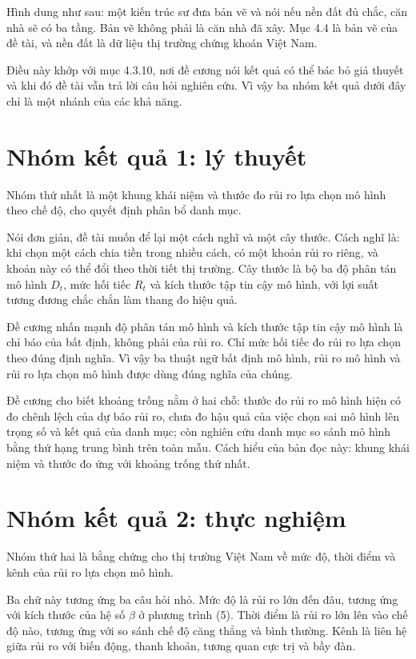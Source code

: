 Hình dung như sau: một kiến trúc sư đưa bản vẽ và nói nếu nền đất đủ chắc, căn nhà sẽ có ba tầng. Bản vẽ không phải là căn nhà đã xây. Mục 4.4 là bản vẽ của đề tài, và nền đất là dữ liệu thị trường chứng khoán Việt Nam.

Điều này khớp với mục 4.3.10, nơi đề cương nói kết quả có thể bác bỏ giả thuyết và khi đó đề tài vẫn trả lời câu hỏi nghiên cứu. Vì vậy ba nhóm kết quả dưới đây chỉ là một nhánh của các khả năng.

\section{Nhóm kết quả 1: lý thuyết}

Nhóm thứ nhất là một khung khái niệm và thước đo rủi ro lựa chọn mô hình theo chế độ, cho quyết định phân bổ danh mục.

Nói đơn giản, đề tài muốn để lại một cách nghĩ và một cây thước. Cách nghĩ là: khi chọn một cách chia tiền trong nhiều cách, có một khoản rủi ro riêng, và khoản này có thể đổi theo thời tiết thị trường. Cây thước là bộ ba độ phân tán mô hình \(D_{t}\), mức hối tiếc \(R_{t}\) và kích thước tập tin cậy mô hình, với lợi suất tương đương chắc chắn làm thang đo hiệu quả.

Đề cương nhấn mạnh độ phân tán mô hình và kích thước tập tin cậy mô hình là chỉ báo của bất định, không phải của rủi ro. Chỉ mức hối tiếc đo rủi ro lựa chọn theo đúng định nghĩa. Vì vậy ba thuật ngữ bất định mô hình, rủi ro mô hình và rủi ro lựa chọn mô hình được dùng đúng nghĩa của chúng.

Đề cương cho biết khoảng trống nằm ở hai chỗ: thước đo rủi ro mô hình hiện có đo chênh lệch của dự báo rủi ro, chưa đo hậu quả của việc chọn sai mô hình lên trọng số và kết quả của danh mục; còn nghiên cứu danh mục so sánh mô hình bằng thứ hạng trung bình trên toàn mẫu. Cách hiểu của bản đọc này: khung khái niệm và thước đo ứng với khoảng trống thứ nhất.

\section{Nhóm kết quả 2: thực nghiệm}

Nhóm thứ hai là bằng chứng cho thị trường Việt Nam về mức độ, thời điểm và kênh của rủi ro lựa chọn mô hình.

Ba chữ này tương ứng ba câu hỏi nhỏ. Mức độ là rủi ro lớn đến đâu, tương ứng với kích thước của hệ số \(\beta\) ở phương trình (5). Thời điểm là rủi ro lớn lên vào chế độ nào, tương ứng với so sánh chế độ căng thẳng và bình thường. Kênh là liên hệ giữa rủi ro với biến động, thanh khoản, tương quan cực trị và bầy đàn.

